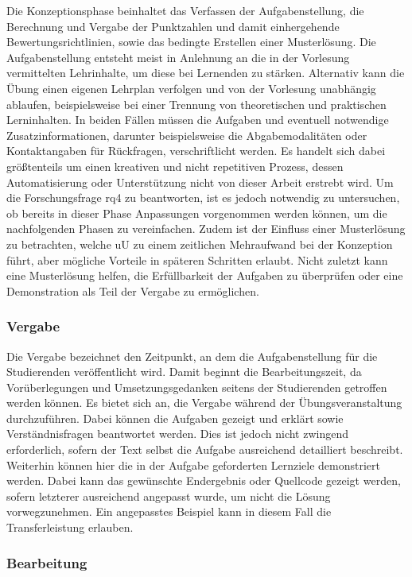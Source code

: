Die Konzeptionsphase beinhaltet das Verfassen der Aufgabenstellung, die Berechnung und Vergabe der Punktzahlen und damit einhergehende Bewertungsrichtlinien, sowie das bedingte Erstellen einer Musterlösung.
Die Aufgabenstellung entsteht meist in Anlehnung an die in der Vorlesung vermittelten Lehrinhalte, um diese bei Lernenden zu stärken.
Alternativ kann die Übung einen eigenen Lehrplan verfolgen und von der Vorlesung unabhängig ablaufen, beispielsweise bei einer Trennung von theoretischen und praktischen Lerninhalten.
In beiden Fällen müssen die Aufgaben und eventuell notwendige Zusatzinformationen, darunter beispielsweise die Abgabemodalitäten oder Kontaktangaben für Rückfragen, verschriftlicht werden.
Es handelt sich dabei größtenteils um einen kreativen und nicht repetitiven Prozess, dessen Automatisierung oder Unterstützung nicht von dieser Arbeit erstrebt wird.
Um die Forschungsfrage \acs{rq}4 zu beantworten, ist es jedoch notwendig zu untersuchen, ob bereits in dieser Phase Anpassungen vorgenommen werden können, um die nachfolgenden Phasen zu vereinfachen.
Zudem ist der Einfluss einer Musterlösung zu betrachten, welche \ac{uU} zu einem zeitlichen Mehraufwand bei der Konzeption führt, aber mögliche Vorteile in späteren Schritten erlaubt.
Nicht zuletzt kann eine Musterlösung helfen, die Erfüllbarkeit der Aufgaben zu überprüfen oder eine Demonstration als Teil der Vergabe zu ermöglichen.

\subsubsection{Vergabe}

Die Vergabe bezeichnet den Zeitpunkt, an dem die Aufgabenstellung für die Studierenden veröffentlicht wird.
Damit beginnt die Bearbeitungszeit, da Vorüberlegungen und Umsetzungsgedanken seitens der Studierenden getroffen werden können.
Es bietet sich an, die Vergabe während der Übungsveranstaltung durchzuführen.
Dabei können die Aufgaben gezeigt und erklärt sowie Verständnisfragen beantwortet werden.
Dies ist jedoch nicht zwingend erforderlich, sofern der Text selbst die Aufgabe ausreichend detailliert beschreibt.
Weiterhin können hier die in der Aufgabe geforderten Lernziele demonstriert werden.
Dabei kann das gewünschte Endergebnis oder Quellcode gezeigt werden, sofern letzterer ausreichend angepasst wurde, um nicht die Lösung vorwegzunehmen.
Ein angepasstes Beispiel kann in diesem Fall die Transferleistung erlauben.

\subsubsection{Bearbeitung}

